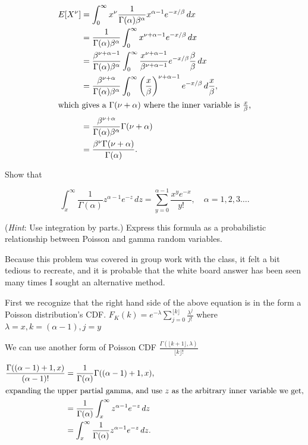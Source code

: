 \documentclass[12pt,letterpaper]{exam}
\begin{document}
\begin{questions}
	\begin{solution}
		\begin{align*}
			E[X^\nu]
			&= \int_{0}^{\infty} x^\nu \frac{1}{\Gamma(\alpha)\beta^\alpha} x^{\alpha-1} e^{-x/\beta} \,dx \\
			&= \frac{1}{\Gamma(\alpha)\beta^\alpha} \int_{0}^{\infty} x^{\nu+\alpha-1} e^{-x/\beta} \,dx \\
			&= \frac{\beta^{\nu+\alpha-1}}{\Gamma(\alpha)\beta^\alpha} \int_{0}^{\infty} \frac{x^{\nu+\alpha-1}}{\beta^{\nu+\alpha-1}} e^{-x/\beta} \frac{\beta}{\beta} \,dx \\
			&= \frac{\beta^{\nu+\alpha}}{\Gamma(\alpha)\beta^\alpha} \int_{0}^{\infty} \left(\frac{x}{\beta}\right)^{\nu+\alpha-1} e^{-x/\beta} \,d\frac{x}{\beta}, \\
			\intertext{which gives a \(\Gamma(\nu+\alpha)\) where the inner variable is \(\frac{x}{\beta}\),}
			&= \frac{\beta^{\nu+\alpha}}{\Gamma(\alpha)\beta^\alpha} \Gamma(\nu+\alpha) \\
			&= \frac{\beta^{\nu}\Gamma(\nu+\alpha)}{\Gamma(\alpha)}.  
		\end{align*}
	\end{solution}
	\clearpage
	
	\setcounter{question}{18}
	\question 
	Show that
	
	\[
		\int_{x}^{\infty} \frac{1}{\Gamma(\alpha)} z^{\alpha-1}e^{-z} \,dz = 
		\sum_{y=0}^{\alpha-1} \frac{x^y e^{-x}}{y!}, \quad \alpha=1,2,3\ldots.
	\]
	
	(\textit{Hint}: Use integration by parts.) Express this formula as a probabilistic relationship
	between Poisson and gamma random variables.
	
	\begin{solution}
		Because this problem was covered in group work with the class, it felt a bit tedious to recreate, 
		and it is probable that the white board answer has been seen many times I sought an alternative method.
		
		
		First we recognize that the right hand side of the above equation is in the form a Poisson distribution's CDF.
		\(F_K(k) = e^{-\lambda}\sum_{j=0}^{\lfloor k\rfloor} \frac{\lambda^j}{j!} \)
		where
		\(\lambda = x, k = (\alpha-1), j = y\)
		
		We can use another form of Poisson CDF
		\(\frac{\Gamma(\lfloor k+1\rfloor,\lambda )}{\lfloor k\rfloor!}\)
		
		\begin{align*}
			\frac{\Gamma((\alpha-1)+1,x )}{(\alpha-1)!}
			&= \frac{1}{\Gamma(\alpha)} \Gamma((\alpha-1)+1,x ), \\
			\intertext{expanding the upper partial gamma, and use \(z\) as the arbitrary inner variable we get,}
			&= \frac{1}{\Gamma(\alpha)} \int_{x}^{\infty} z^{\alpha-1} e^{-z} \,dz \\
			&=  \int_{x}^{\infty} \frac{1}{\Gamma(\alpha)} z^{\alpha-1} e^{-z} \,dz.
		\end{align*}
		

\end{solution}
\end{questions}
\end{document}

